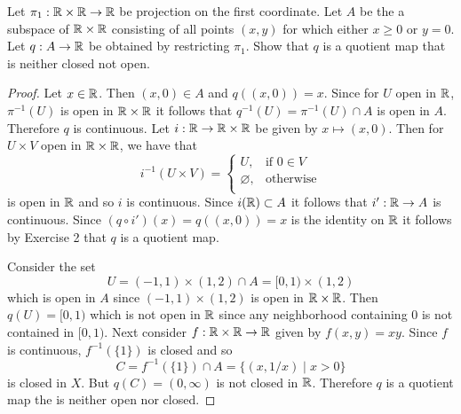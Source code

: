 \begin{ex}{22.3}
    Let $\pi_1:\mathbb{R}\times\mathbb{R}\to\mathbb{R}$ be projection on the first coordinate. 
    Let $A$ be the a subspace of $\mathbb{R}\times\mathbb{R}$ consisting of all points $(x,y)$ for which either $x\geq 0$ or $y=0$.
    Let $q:A\to\mathbb{R}$ be obtained by restricting $\pi_1$. Show that $q$ is a quotient map that is neither closed not open.
\end{ex}
\begin{proof}
    Let $x\in\mathbb{R}$. Then $(x,0)\in A$ and $q\left((x,0)\right)=x$. Since for $U$ open in $\mathbb{R}$, $\pi^{-1}(U)$ is open in $\mathbb{R}\times\mathbb{R}$ it follows that $q^{-1}(U)=\pi^{-1}(U)\cap A$ is open in $A$.
    Therefore $q$ is continuous. Let $i:\mathbb{R}\to\mathbb{R}\times\mathbb{R}$ be given by $x\mapsto(x,0)$. 
    Then for $U\times V$ open in $\mathbb{R}\times\mathbb{R}$, we have that
    $$i^{-1}(U\times V)=\begin{cases}
        U,&\text{if } 0\in V\\
        \varnothing,&\text{otherwise}\\
    \end{cases}$$
    is open in $\mathbb{R}$ and so $i$ is continuous. 
    Since $i(\mathbb{R})\subset A$ it follows that $i':\mathbb{R}\to A$ is continuous. 
    Since $(q\circ i')(x)=q((x,0))=x$ is the identity on $\mathbb{R}$ it follows by Exercise 2 that $q$ is a quotient map.
    
    Consider the set 
    $$U = (-1,1)\times (1, 2)\cap A=[0,1)\times(1,2)$$
    which is open in $A$ since $(-1,1)\times (1, 2)$ is open in $\mathbb{R}\times\mathbb{R}$. 
    Then $q(U)=[0,1)$ which is not open in $\mathbb{R}$ since any neighborhood containing 0 is not contained in $[0,1)$.
    Next consider $f:\mathbb{R}\times\mathbb{R}\to\mathbb{R}$ given by $f(x,y)=xy$. Since $f$ is continuous, $f^{-1}(\{1\})$ is closed and so
    $$C=f^{-1}(\{1\})\cap A=\{(x,1/x)\mid x>0\}$$
    is closed in $X$. But $q(C)=(0,\infty)$ is not closed in $\mathbb{R}$. Therefore $q$ is a quotient map the is neither open nor closed.
\end{proof}

